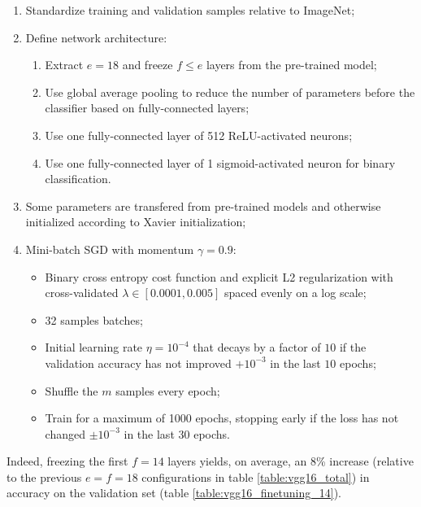 \begin{enumerate}
    \item Standardize training and validation samples relative to ImageNet;
    \item Define network architecture:
        \begin{enumerate}
            \item Extract $e = 18$ and freeze $f \leq e$ layers from the pre-trained model;
            \item Use global average pooling to reduce the number of parameters before the classifier based on fully-connected layers;
            \item Use one fully-connected layer of 512 ReLU-activated neurons;
            \item Use one fully-connected layer of 1 sigmoid-activated neuron for binary classification.
        \end{enumerate}
    \item Some parameters are transfered from pre-trained models and otherwise initialized according to Xavier initialization;
    \item Mini-batch \ac{SGD} with momentum $\gamma = 0.9$:
        \begin{itemize}
            \item Binary cross entropy cost function and explicit L2 regularization with cross-validated $\lambda \in [0.0001, 0.005]$ spaced evenly on a log scale;
            \item 32 samples batches;
            \item Initial learning rate $\eta = 10^{-4}$ that decays by a factor of $10$ if the validation accuracy has not improved $+10^{-3}$ in the last $10$ epochs;
            \item Shuffle the $m$ samples every epoch;
            \item Train for a maximum of 1000 epochs, stopping early if the loss has not changed $\pm 10^{-3}$ in the last $30$ epochs.
        \end{itemize}
\end{enumerate}

Indeed, freezing the first $f = 14$ layers yields, on average, an 8\% increase (relative to the previous $e = f = 18$ configurations in table \ref{table:vgg16_total}) in accuracy on the validation set (table \ref{table:vgg16_finetuning_14}).

